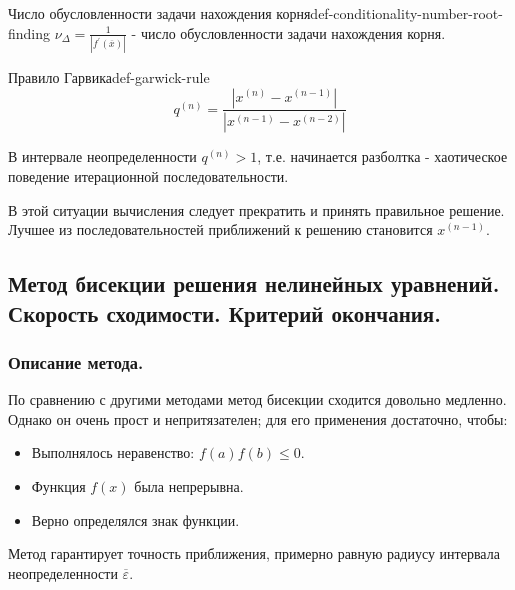 \documentclass[14pt]{extarticle}
\begin{document}
        \begin{definition}{Число обусловленности задачи нахождения корня}{def-conditionality-number-root-finding}
            $\nu_{\Delta} = \frac{1}{|f^{'}(\overline{x})|}$ - число обусловленности задачи нахождения корня.
        \end{definition}

        \begin{definition}{Правило Гарвика}{def-garwick-rule}
            $$q^{(n)} = \frac{|x^{(n)} - x^{(n - 1)}|}{|x^{(n - 1)} - x^{(n - 2)}|}$$

            В интервале неопределенности $q^{(n)} > 1$, т.е. начинается разболтка - хаотическое поведение итерационной последовательности.

            \vspace{\baselineskip}

            В этой ситуации вычисления следует прекратить и принять правильное решение. Лучшее из последовательностей приближений к решению становится $x^{(n-1)}$.
        \end{definition}

\clearpage
\subsection{Метод бисекции решения нелинейных уравнений. Скорость сходимости. Критерий окончания.}

    \subsubsection{Описание метода.}

        По сравнению с другими методами метод бисекции сходится довольно медленно. Однако он очень прост и непритязателен; для его применения достаточно, чтобы: 
        \begin{itemize}
            \item Выполнялось неравенство: $f(a)f(b) \leq 0$.
            \item Функция $f(x)$ была непрерывна.
            \item Верно определялся знак функции.
        \end{itemize}
            
        \vspace{\baselineskip}

        Метод гарантирует точность приближения, примерно равную радиусу интервала неопределенности $\overline{\varepsilon}$.
\end{document}
